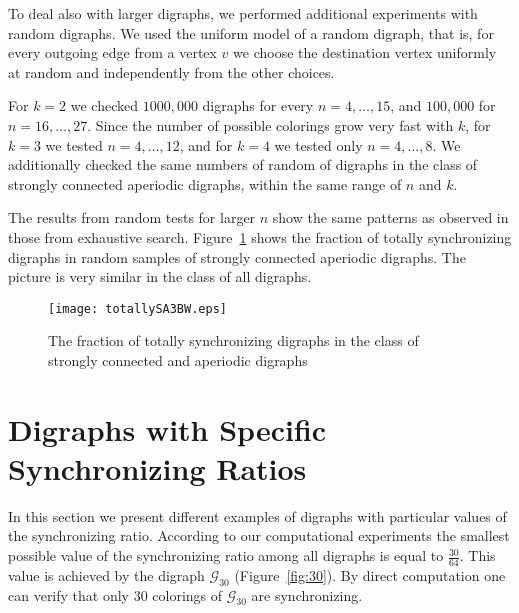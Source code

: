 \documentclass[runningheads]{llncs}
\begin{document}
To deal also with larger digraphs, we performed additional experiments with random digraphs.
We used the uniform model of a random digraph, that is, for every outgoing edge from a vertex $v$ we choose the destination vertex uniformly at random and independently from the other choices.

For $k=2$ we checked $1000,000$ digraphs for every $n=4,\ldots,15$, and $100,000$ for $n=16,\ldots,27$.
Since the number of possible colorings grow very fast with $k$, for $k=3$ we tested $n=4,\ldots,12$, and for $k=4$ we tested only $n=4,\ldots,8$.
We additionally checked the same numbers of random of digraphs in the class of strongly connected aperiodic digraphs, within the same range of $n$ and $k$.

The results from random tests for larger $n$ show the same patterns as observed in those from exhaustive search.
Figure~\ref{fig:totally} shows the fraction of totally synchronizing digraphs in random samples of strongly connected aperiodic digraphs.
The picture is very similar in the class of all digraphs.


\begin{comment}
\begin{figure}
\centering
\texttt{[image: ratio.eps]}
\caption{Average synchronizing ratio of random digraphs.\MSZ{Add k=4.}}
\label{fig:ratio}
\end{figure}
\end{comment}

\begin{figure}
\centering
\texttt{[image: totallySA3BW.eps]}
\caption{The fraction of totally synchronizing digraphs in the class of strongly connected and aperiodic digraphs}
\label{fig:totally}
\end{figure}


\section{Digraphs with Specific Synchronizing Ratios}

In this section we present different examples of digraphs with particular values of the synchronizing ratio.
According to our computational experiments the smallest possible value of the synchronizing ratio among all digraphs is equal to $\frac{30}{64}$. This value is achieved by the digraph $\mathcal{G}_{30}$ (Figure~\ref{fig:30}).
By direct computation one can verify that only 30 colorings of $\mathcal{G}_{30}$ are synchronizing.
\end{document}
